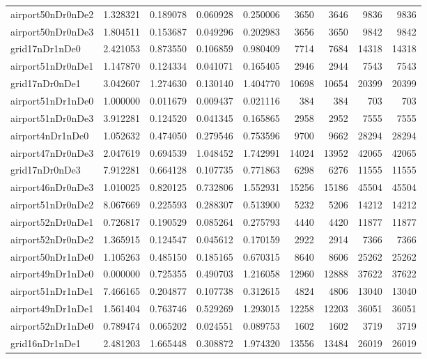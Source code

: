 \begin{longtable}{|l|r|r|r|r|r|r|r|r|}
airport50nDr0nDe2 & 1.328321 & 0.189078 & 0.060928 & 0.250006 & 3650 & 3646 & 9836 & 9836 \\
airport50nDr0nDe3 & 1.804511 & 0.153687 & 0.049296 & 0.202983 & 3656 & 3650 & 9842 & 9842 \\
grid17nDr1nDe0 & 2.421053 & 0.873550 & 0.106859 & 0.980409 & 7714 & 7684 & 14318 & 14318 \\
airport51nDr0nDe1 & 1.147870 & 0.124334 & 0.041071 & 0.165405 & 2946 & 2944 & 7543 & 7543 \\
grid17nDr0nDe1 & 3.042607 & 1.274630 & 0.130140 & 1.404770 & 10698 & 10654 & 20399 & 20399 \\
airport51nDr1nDe0 & 1.000000 & 0.011679 & 0.009437 & 0.021116 & 384 & 384 & 703 & 703 \\
airport51nDr0nDe3 & 3.912281 & 0.124520 & 0.041345 & 0.165865 & 2958 & 2952 & 7555 & 7555 \\
airport4nDr1nDe0 & 1.052632 & 0.474050 & 0.279546 & 0.753596 & 9700 & 9662 & 28294 & 28294 \\
airport47nDr0nDe3 & 2.047619 & 0.694539 & 1.048452 & 1.742991 & 14024 & 13952 & 42065 & 42065 \\
grid17nDr0nDe3 & 7.912281 & 0.664128 & 0.107735 & 0.771863 & 6298 & 6276 & 11555 & 11555 \\
airport46nDr0nDe3 & 1.010025 & 0.820125 & 0.732806 & 1.552931 & 15256 & 15186 & 45504 & 45504 \\
airport51nDr0nDe2 & 8.067669 & 0.225593 & 0.288307 & 0.513900 & 5232 & 5206 & 14212 & 14212 \\
airport52nDr0nDe1 & 0.726817 & 0.190529 & 0.085264 & 0.275793 & 4440 & 4420 & 11877 & 11877 \\
airport52nDr0nDe2 & 1.365915 & 0.124547 & 0.045612 & 0.170159 & 2922 & 2914 & 7366 & 7366 \\
airport50nDr1nDe0 & 1.105263 & 0.485150 & 0.185165 & 0.670315 & 8640 & 8606 & 25262 & 25262 \\
airport49nDr1nDe0 & 0.000000 & 0.725355 & 0.490703 & 1.216058 & 12960 & 12888 & 37622 & 37622 \\
airport51nDr1nDe1 & 7.466165 & 0.204877 & 0.107738 & 0.312615 & 4824 & 4806 & 13040 & 13040 \\
airport49nDr1nDe1 & 1.561404 & 0.763746 & 0.529269 & 1.293015 & 12258 & 12203 & 36051 & 36051 \\
airport52nDr1nDe0 & 0.789474 & 0.065202 & 0.024551 & 0.089753 & 1602 & 1602 & 3719 & 3719 \\
grid16nDr1nDe1 & 2.481203 & 1.665448 & 0.308872 & 1.974320 & 13556 & 13484 & 26019 & 26019 \\

\end{longtable}
